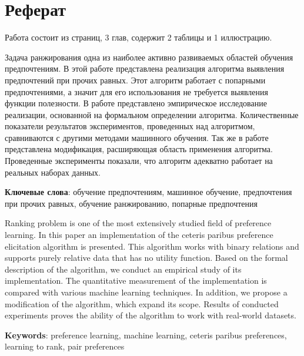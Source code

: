 \chapter*{Реферат}

Работа состоит из \pageref{LastPage} страниц, 3 глав, содержит 2 таблицы и 1 иллюстрацию. 

\vspace{2em}

Задача ранжирования одна из наиболее активно развиваемых областей обучения предпочтениям. В этой работе представлена реализация алгоритма выявления предпочтений при прочих равных. Этот алгоритм работает с попарными предпочтениями, а значит для его использования не требуется выявления функции полезности. В работе представлено эмпирическое исследование реализации, основанной на формальном определении алгоритма. Количественные показатели результатов экспериментов, проведенных над алгоритмом, сравниваются с другими методами машинного обучения. Так же в работе представлена модификация, расширяющая область применения алгоритма. Проведенные эксперименты показали, что алгоритм адекватно работает на реальных наборах данных.

\textbf{Ключевые слова}: обучение предпочтениям, машинное обучение, предпочтения при прочих равных, обучение ранжированию, попарные предпочтения 


\vspace{2em}


Ranking problem is one of the most extensively studied field of preference learning. In this paper an implementation of the ceteris paribus preference elicitation algorithm is presented. This algorithm works with binary relations and supports purely relative data that has no utility function. Based on the formal description of the algorithm, we conduct an empirical study of its implementation. The quantitative measurement of the implementation is compared with various machine learning techniques. In addition, we propose a modification of the algorithm, which expand its scope. Results of conducted experiments proves the ability of the algorithm to work with real-world datasets.

\textbf{Keywords}: preference learning, machine learning, ceteris paribus preferences, learning to rank, pair preferences